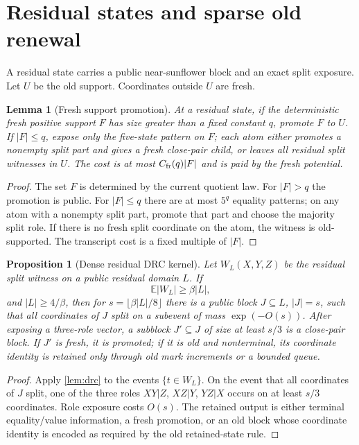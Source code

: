 \documentclass[11pt]{article}
\newcommand{\Cref}[1]{\ref{#1}}
\newtheorem{lemma}[theorem]{Lemma}
\newtheorem{proposition}[theorem]{Proposition}
\theoremstyle{remark}
\newcommand{\E}{\mathbb E}
\begin{document}
\section{Residual states and sparse old renewal}\label{sec:residual}

A residual state carries a public near-sunflower block and an exact split exposure.  Let $U$ be the old support.  Coordinates outside $U$ are fresh.

\begin{lemma}[Fresh support promotion]\label{lem:fresh-promotion}
At a residual state, if the deterministic fresh positive support $F$ has size greater than a fixed constant $q$, promote $F$ to $U$.  If $|F|\le q$, expose only the five-state pattern on $F$; each atom either promotes a nonempty split part and gives a fresh close-pair child, or leaves all residual split witnesses in $U$.  The cost is at most $C_{\rm fr}(q)|F|$ and is paid by the fresh potential.
\end{lemma}

\begin{proof}
The set $F$ is determined by the current quotient law.  For $|F|>q$ the promotion is public.  For $|F|\le q$ there are at most $5^q$ equality patterns; on any atom with a nonempty split part, promote that part and choose the majority split role.  If there is no fresh split coordinate on the atom, the witness is old-supported.  The transcript cost is a fixed multiple of $|F|$.
\end{proof}

\begin{proposition}[Dense residual DRC kernel]\label{prop:dense-residual}
Let $W_L(X,Y,Z)$ be the residual split witness on a public residual domain $L$.  If
\[
        \E |W_L|\ge \beta |L|,
\]
and $|L|\ge 4/\beta$, then for $s=\lfloor\beta |L|/8\rfloor$ there is a public block $J\subseteq L$, $|J|=s$, such that all coordinates of $J$ split on a subevent of mass $\exp(-O(s))$.  After exposing a three-role vector, a subblock $J'\subseteq J$ of size at least $s/3$ is a close-pair block.  If $J'$ is fresh, it is promoted; if it is old and nonterminal, its coordinate identity is retained only through old mark increments or a bounded queue.
\end{proposition}

\begin{proof}
Apply \Cref{lem:drc} to the events $\{t\in W_L\}$.  On the event that all coordinates of $J$ split, one of the three roles $XY|Z$, $XZ|Y$, $YZ|X$ occurs on at least $s/3$ coordinates.  Role exposure costs $O(s)$.  The retained output is either terminal equality/value information, a fresh promotion, or an old block whose coordinate identity is encoded as required by the old retained-state rule.
\end{proof}
\end{document}

